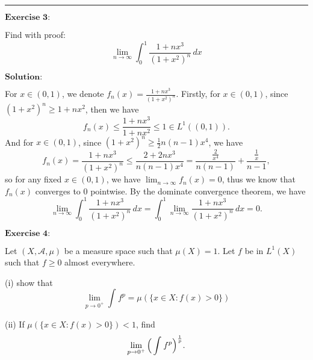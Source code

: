 \documentclass[12pt,a4paper]{ctexart}
\begin{document}
\noindent\rule[0.25\baselineskip]{\textwidth}{0.5pt}

\vspace{8pt}

$\textbf{Exercise 3:}$

Find with proof:
\begin{equation*}
    \lim_{n \to \infty} \int_{0}^{1} \frac{1 + n x^{3}}{(1 + x^{2})^{n}} \, d x 
\end{equation*}

\vspace{8pt}
$\textbf{Solution:}$

For $x \in (0, 1)$, we denote $f_{n}(x) = \frac{1 + n x^{3}}{(1 + x^{2})^{n}}$. Firstly, for $x \in (0, 1)$, since $(1 + x^{2})^{n} \geq 1 + n x^{2}$, then we have
\begin{equation*}
    f_{n}(x) \leq \frac{1 + n x^{3}}{1 + n x^{2}} \leq 1 \in L^{1}((0, 1)).
\end{equation*}
And for $x \in (0, 1)$, since $(1 + x^{2})^{n} \geq \frac{1}{2}n(n-1) x^{4}$, we have
\begin{equation*}
    f_{n}(x) = \frac{1 + n x^{3}}{(1 + x^{2})^{n}} \leq \frac{2 + 2 n x^{3}}{n(n-1) x^{4}}  = \frac{\frac{2}{x^{4}}}{n(n - 1)} + \frac{\frac{1}{x}}{n-1},
\end{equation*}
so for any fixed $x \in (0, 1)$, we have $\lim_{n \to \infty} f_{n} (x) = 0$, thus we know that $f_{n}(x)$ converges to $0$ pointwise. By the dominate convergence theorem, we have
\begin{equation*}
    \lim_{n \to \infty} \int_{0}^{1} \frac{1 + n x^{3}}{(1 + x^{2})^{n}} \, d x = \int_{0}^{1} \lim_{n \to \infty} \frac{1 + n x^{3}}{(1 + x^{2})^{n}} \, d x = 0.
\end{equation*}

\vspace{8pt}

$\textbf{Exercise 4:}$

Let $(X, \mathcal{A}, \mu)$ be a measure space such that $\mu(X) = 1$. Let $f$ be in $L^{1}(X)$ such that $f \geq 0$ almost everywhere.

(i) show that
\begin{equation*}
    \lim_{p \to 0^{+}} \int_{}^{} f^{p} = \mu(\{x \in X:  f(x) > 0\})
\end{equation*}

(ii) If $\mu(\{x \in X:  f(x) > 0\}) < 1$, find
\begin{equation*}
    \lim_{p \to 0^{+}} \Big{(} \int_{}^{} f^{p} \Big{)}^{\frac{1}{p}}. 
\end{equation*}
\end{document}
